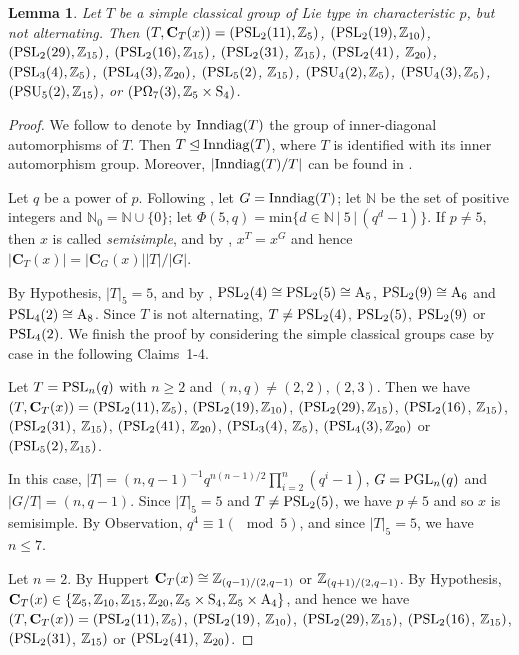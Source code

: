 \documentclass[12pt,reqno]{amsart}
\renewcommand\div{\,\big|\,} \newcommand\ddiv{\,\big\Vert\,}\newcommand\notdiv{{\,\not\big|\,}}
\newcommand\A{\mathrm{A}} \newcommand\AGL{\mathrm{AGL}} \newcommand\AGammaL{\mathrm{A\Gamma L}} \newcommand\Alt{\mathrm{Alt}} \newcommand\ASL{\mathrm{ASL}} \newcommand\ASigmaL{\mathrm{A \Sigma L}} \newcommand\Aut{\mathrm{Aut}}
\def\C{\mathbf{C}}   \newcommand\Cay{\mathrm{Cay}}   \newcommand\Cos{\mathrm{Cos}} \newcommand{\CGammaSp}{\mathrm{C\Gamma Sp}}
\newcommand\ID{{\rm Inndiag}}
\numberwithin {equation} {section}
\newtheorem{lemma}[theorem]{Lemma}
\begin{document}
\begin{lemma}\label{lm:classical}
Let $T$ be a  simple classical group of Lie type in characteristic $p$, but not alternating. Then $(T,\C_T(x))= (\PSL_2(11), \ZZ_{5})$, $(\mathrm{PSL}_2(19),\mathbb{Z}_{10})$, $(\mathrm{PSL}_2(29), \mathbb{Z}_{15})$,  $(\mathrm{PSL}_2(16),\mathbb{Z}_{15})$, $(\mathrm{PSL}_2(31)$, $\mathbb{Z}_{15})$, $(\mathrm{PSL}_2(41)$, $\mathbb{Z}_{20})$, $(\mathrm{PSL}_3(4), \mathbb{Z}_{5})$,  $(\mathrm{PSL}_4(3), \mathbb{Z}_{20})$, $(\mathrm{PSL}_5(2)$, $\mathbb{Z}_{15})$,
 $(\mathrm{PSU}_4(2), \mathbb{Z}_{5})$, $(\mathrm{PSU}_4(3),\mathbb{Z}_{5})$, $(\mathrm{PSU}_5(2),\mathbb{Z}_{15})$, or $(\mathrm{P\Omega}_7(3),\mathbb{Z}_{5} \times\mathrm{S}_4)$.
 \end{lemma}
\begin{proof} We follow \cite[Definition 2.5.10]{CFSG} to denote by $ \ID(T)$ the group of inner-diagonal automorphisms of $T$. Then $T \unlhd \ID(T)$, where $T$ is identified with its inner automorphism group. Moreover,
 $|\ID(T)/T|$ can be found  in \cite[Theorem 2.5.12 (c)]{CFSG}.

Let $q$ be a power of $p$. Following \cite{B-G}, let $G=\ID(T)$; let   $\mathbb{N}$ be the set of  positive integers and $\mathbb{N}_{0}=\mathbb{N} \cup \{ 0\} $; let $\Phi(5,q)=\mbox{min}\{d \in \mathbb{N}\ |\ 5 \div (q^d-1) \}$.
If $p\neq 5$, then $x$ is called  \emph{semisimple}, and by \cite[Theorem 3.1.12]{B-G}, $x^T=x^G$ and hence $|\C_T(x)|= |\C_G(x)||T|/|G|$.


By Hypothesis, $|T|_5=5$, and by \cite[Proposition 2.9.1]{K-Lie}, $\PSL_2(4)\cong\PSL_2(5)\cong \A_5$, $\PSL_2(9) \cong \A_6$ and $\PSL_4(2) \cong \A_8$. Since $T$ is not alternating, $T \neq \mathrm{PSL}_2(4)$, $\mathrm{PSL}_2(5)$, $\mathrm{PSL}_2(9)$ or $\mathrm{PSL}_4(2)$.
We finish the proof by considering the simple  classical  groups case by case in the following Claims~1-4.


\medskip

 Let $T=\mathrm{PSL}_n(q)$ with $n\geq 2$ and $(n,q) \neq (2,2),(2,3)$. Then we have $(T,\C_T(x))=(\PSL_2(11), \ZZ_{5})$, $(\mathrm{PSL}_2(19),\mathbb{Z}_{10})$, $(\mathrm{PSL}_2(29), \mathbb{Z}_{15})$,  $(\mathrm{PSL}_2(16)$, $\mathbb{Z}_{15})$, $(\mathrm{PSL}_2(31)$, $\mathbb{Z}_{15})$, $(\mathrm{PSL}_2(41)$, $\mathbb{Z}_{20})$, $(\mathrm{PSL}_3(4)$, $\mathbb{Z}_{5})$,  $(\mathrm{PSL}_4(3), \mathbb{Z}_{20})$ or $(\mathrm{PSL}_5(2), \mathbb{Z}_{15})$.


In this case, $|T|= (n,q-1)^{-1}q^{n(n-1)/2}\prod_{i=2}^{n}(q^i-1)$, $G=\mathrm{PGL}_n(q)$ and $|G/T|=(n,q-1)$.  Since $|T|_5=5$ and $T \neq \mathrm{PSL}_2(5)$, we have $p\neq 5$ and so $x$ is semisimple. By Observation, $q^4 \equiv 1 (\mod 5)$, and since $|T|_5=5$, we have $n\leq 7$.

Let $n=2$. By Huppert \cite[Chapter 2: Theorems 8.3-8.5]{H1967} $\C_T(x) \cong \ZZ_{(q-1)/(2,q-1)}$ or $\mathbb{Z}_{(q+1)/(2,q-1)}$. By Hypothesis, $\C_T(x) \in \{ \ZZ_5,\ZZ_{10},\ZZ_{15},\ZZ_{20},\ZZ_5 \times\Sy_4, \ZZ_5 \times \A_4\}$, and hence we have $(T,\C_T(x))= (\PSL_2(11), \ZZ_{5})$, $(\mathrm{PSL}_2(19)$, $\mathbb{Z}_{10})$, $(\mathrm{PSL}_2(29), \mathbb{Z}_{15})$,  $(\mathrm{PSL}_2(16)$, $\mathbb{Z}_{15})$, $(\mathrm{PSL}_2(31)$, $\mathbb{Z}_{15})$ or $(\mathrm{PSL}_2(41)$, $\mathbb{Z}_{20})$.


\end{proof}
\end{document}
